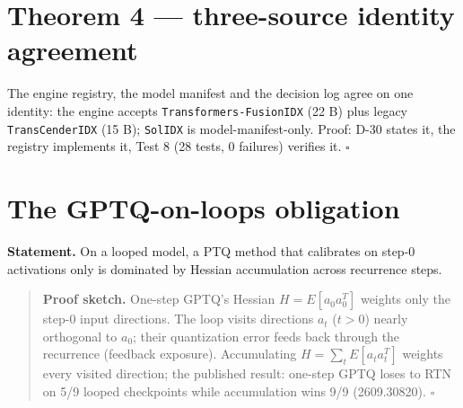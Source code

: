 \section{Theorem 4 --- three-source identity agreement}

The engine registry, the model manifest and the decision log agree on one identity: the engine
accepts \texttt{Transformers-FusionIDX} (22 B) plus legacy \texttt{TransCenderIDX} (15 B);
\texttt{SolIDX} is model-manifest-only. Proof: D-30 states it, the registry implements it,
Test 8 (28 tests, 0 failures) verifies it. \hfill$\square$

\section{The GPTQ-on-loops obligation}

\textbf{Statement.} On a looped model, a PTQ method that calibrates on step-0 activations only
is dominated by Hessian accumulation across recurrence steps.

\begin{quote}
\textbf{Proof sketch.} One-step GPTQ's Hessian $H = E[a_0a_0^T]$ weights only the step-0 input
directions. The loop visits directions $a_t$ ($t>0$) nearly orthogonal to $a_0$; their
quantization error feeds back through the recurrence (feedback exposure). Accumulating
$H = \sum_t E[a_t a_t^T]$ weights every visited direction; the published result: one-step GPTQ
loses to RTN on 5/9 looped checkpoints while accumulation wins 9/9 (2609.30820).
\hfill$\square$
\end{quote}
